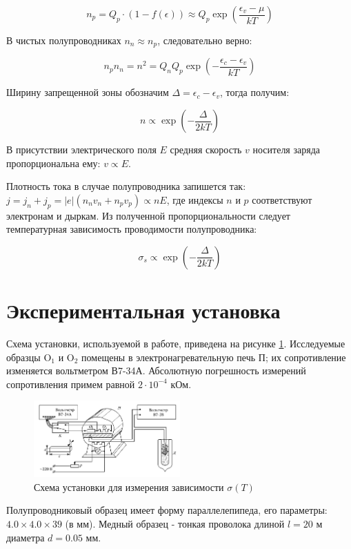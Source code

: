 \documentclass[12pt]{kiarticle}
\begin{document}
	\[ n_p = Q_p \cdot (1 - f(\epsilon)) \approx Q_p \exp\left(\frac{\epsilon_v - \mu}{kT}\right) \]
	
	В чистых полупроводниках $n_n \approx n_p$, следовательно верно: 
	
	\[ n_pn_n = n^2 = Q_nQ_p\exp\left(-\frac{\epsilon_c - \epsilon_v}{kT}\right) \]
	
	Ширину запрещенной зоны обозначим $\Delta = \epsilon_c - \epsilon_v$, тогда получим: 
	
	\[ n \propto \exp\left(-\frac{\Delta}{2kT}\right) \]	
	
	В присутствии электрического поля $E$ средняя скорость $v$ носителя заряда пропорциональна ему: $v \propto E$. 
	
	Плотность тока в случае полупроводника запишется так: $j = j_n + j_p = |e|(n_nv_n + n_pv_p) \propto nE$, где индексы $n$ и $p$ соответствуют электронам и дыркам. Из полученной пропорциональности следует температурная зависимость проводимости полупроводника: 
	
	\[ \sigma_s \propto \exp\left(-\frac{\Delta}{2kT}\right) \]
	
	\section{Экспериментальная установка}
	
	Схема установки, используемой в работе, приведена на рисунке \ref{pic:scheme}. Исследуемые образцы O$_1$ и O$_2$ помещены в электронагревательную печь П; их сопротивление изменяется вольтметром В7-34А. Абсолютную погрешность измерений сопротивления примем равной $2\cdot10^{-4}$ кОм. 
	
	\begin{figure}[h]
		\centering	
		\includegraphics[width=0.5\textwidth]{scheme.png}
		\caption{Схема установки для измерения зависимости $\sigma(T)$}
		\label{pic:scheme}
	\end{figure} 
	
	Полупроводниковый образец имеет форму параллелепипеда, его параметры: $4.0 \times 4.0 \times 39$ (в мм). Медный образец - тонкая проволока длиной $l = 20$ м диаметра $d = 0.05$ мм.
	
\end{document}
